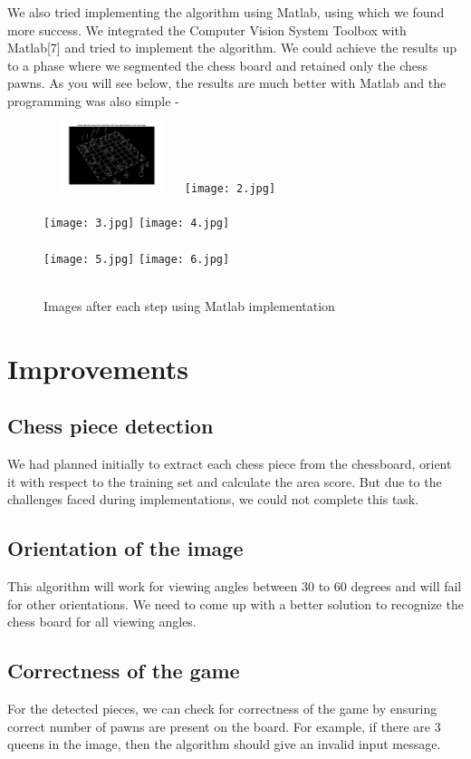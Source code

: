 \documentclass[conference]{IEEEtran}
\begin{document}
We also tried implementing the algorithm using Matlab, using which we found more success. We integrated the Computer Vision System Toolbox with Matlab[7] and tried to implement the algorithm. We could achieve the results up to a phase where we segmented the chess board and retained only the chess pawns. As you will see below, the results are much better with Matlab and the programming was also simple - 

\begin{figure}[bhp]
	\includegraphics[width=4cm,height=2cm]{1.jpg}
	\texttt{[image: 2.jpg]}\\ \\
	\texttt{[image: 3.jpg]}
	\texttt{[image: 4.jpg]}\\ \\
	\texttt{[image: 5.jpg]}
	\texttt{[image: 6.jpg]}\\ \\
	\caption{Images after each step using Matlab implementation}
\end{figure}


\section{Improvements}
\subsection{Chess piece detection}
We had planned initially to extract each chess piece from the chessboard, orient it with respect to the training set and calculate the area score. But due to the challenges faced during implementations, we could not complete this task. 
\subsection{Orientation of the image}
This algorithm will work for viewing angles between 30 to 60 degrees and will fail for other orientations. We need to come up with a better solution to recognize the chess board for all viewing angles. 
\subsection{Correctness of the game}
For the detected pieces, we can check for correctness of the game by ensuring correct number of pawns are present on the board. For example, if there are 3 queens in the image, then the algorithm should give an invalid input message.
\end{document}
